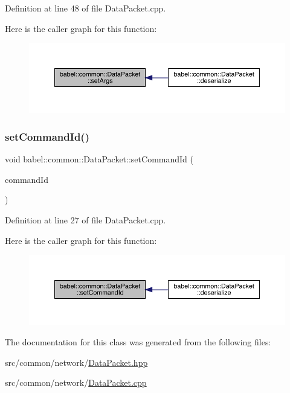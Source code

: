 Definition at line 48 of file Data\+Packet.\+cpp.

Here is the caller graph for this function\+:\nopagebreak
\begin{figure}[H]
\begin{center}
\leavevmode
\includegraphics[width=350pt]{classbabel_1_1common_1_1_data_packet_aa81d00824a4e02c4800cb0f98a054527_icgraph}
\end{center}
\end{figure}
\mbox{\label{classbabel_1_1common_1_1_data_packet_ad156fb4f229df76b32fa8511eeb76b40}} 
\subsubsection{\texorpdfstring{set\+Command\+Id()}{setCommandId()}}
{\footnotesize\ttfamily void babel\+::common\+::\+Data\+Packet\+::set\+Command\+Id (\begin{DoxyParamCaption}\item[{\mbox{\hyperlink{namespacebabel_1_1common_a2d31f246c776da6bf656bd71e86cbb2c}{Command\+Name}}}]{command\+Id }\end{DoxyParamCaption})}



Definition at line 27 of file Data\+Packet.\+cpp.

Here is the caller graph for this function\+:\nopagebreak
\begin{figure}[H]
\begin{center}
\leavevmode
\includegraphics[width=350pt]{classbabel_1_1common_1_1_data_packet_ad156fb4f229df76b32fa8511eeb76b40_icgraph}
\end{center}
\end{figure}


The documentation for this class was generated from the following files\+:\begin{DoxyCompactItemize}
\item 
src/common/network/\mbox{\hyperlink{_data_packet_8hpp}{Data\+Packet.\+hpp}}\item 
src/common/network/\mbox{\hyperlink{_data_packet_8cpp}{Data\+Packet.\+cpp}}\end{DoxyCompactItemize}
